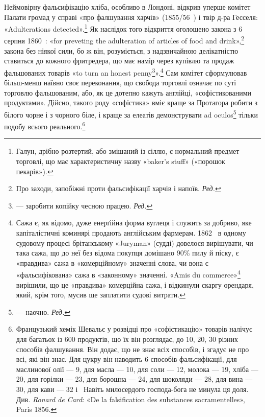 Неймовірну фальсифікацію хліба, особливо в Лондоні, відкрив
уперше комітет Палати громад у справі «про фалшування
харчів» (1855/56~) і твір д-ра Гесселя: «Adulterations
detected».\footnote{
Галун, дрібно розтертий, або змішаний із сіллю, є нормальний
предмет торговлі, що має характеристичну назву «baker’s stuff» («порошок
пекарів»).
} Як наслідок того відкриття оголошено закона з 6 серпня
1860~: «for preveting the adulteration of articles of food
and drink»,\footnote*{
Про заходи, запобіжні проти фальсифікації харчів і напоїв. \emph{Ред.}
} закона без ніякої сили, бо ж він, розуміється, з
надзвичайною делікатністю ставиться до кожного фритредера,
що має намір через купівлю та продаж фальшованих товарів «to
turn an honest penny\footnote*{
— заробити копійку чесною працею. \emph{Ред.}
}».\footnote{
Сажа є, як відомо, дуже енерґійна форма вуглеця і служить за
добриво, яке капіталістичні коминярі продають англійським фармерам.
1862~ в одному судовому процесі брітанському «Juryman» (судді) довелося
вирішувати, чи така сажа, що до неї без відома покупця домішано
90\% пилу й піску, є «правдива» сажа в «комерційному» значенні слова,
чи вона є «фальсифікована» сажа в «законному» значенні. «Amis du
commerce»\footnote*{
Друзі торговлі. \emph{Ред.}
} вирішили, що це «правдива» комерційна сажа, і відкинули
скаргу орендаря, який, крім того, мусив ще заплатити судові витрати.
} Сам комітет сформулював більш-менш
наївно своє переконання, що свобода торговлі означає по суті
торговлю фальшованим, або, як це дотепно кажуть англійці, «софістикованими
продуктами». Дійсно, такого роду «софістика»
вміє краще за Протагора робити з білого чорне і з чорного біле,
і краще за елеатів демонструвати ad oculos\footnote*{
— наочно. \emph{Ред.}
} тільки подобу всього
реального.\footnote{
Французький хемік Шевальє у розвідці про «софістикацію» товарів
налічує для багатьох із 600 продуктів, що їх він розглядає, до 10, 20,
30 різних способів фалшування. Він додає, що не знає всіх способів, і
згадує не про всі, які він знає. Для цукру він наводить 6 способів фальсифікації,
для маслинової олії — 9, для масла — 10, для соли — 12, молока
— 19, хліба — 20, для горілки — 23, для борошна — 24, для шоколяди
— 28, для вина — 30, для кави — 32 і~ Навіть милосердого господа-бога
не минула ця доля. Див. \emph{Ronard de Card}: «De la falsification
des substances sacramentelles», Paris 1856.
}

